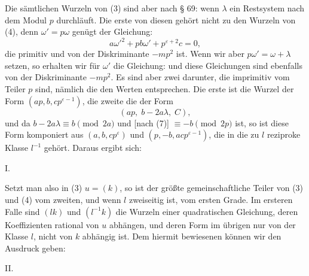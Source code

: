Die sämtlichen Wurzeln von (3) sind aber nach § 69:
wenn $\lambda$ ein Restsystem nach dem Modul $p$ durchläuft. Die erste
von diesen gehört nicht zu den Wurzeln von (4), denn $\omega' = p\omega$
genügt der Gleichung:
\[
a\omega'^2 + p b \omega' + p^{\varepsilon+2} c = 0,
\]
die primitiv und von der Diskriminante $-mp^2$ ist. Wenn wir aber
$p\omega' = \omega + \lambda$ setzen, so erhalten wir für $\omega'$ die Gleichung:
und diese Gleichungen sind ebenfalls von der Diskriminante
$-mp^2$. Es sind aber zwei darunter, die imprimitiv vom Teiler $p$
sind, nämlich die den Werten
entsprechen. Die erste ist die Wurzel der Form $(a p, b, c p^{\varepsilon-1})$, die
zweite die der Form
\[
(a p, \; b - 2a\lambda, \; C),
\]
und da $b - 2a\lambda \equiv b \pmod{2a}$ und [nach (7)] $\equiv -b \pmod{2p}$
ist, so ist diese Form komponiert aus $(a, b, c p^{\varepsilon})$ und $(p, -b, a c p^{\varepsilon-1})$,
die in die zu $l$ reziproke Klasse $l^{-1}$ gehört. Daraus ergibt sich:

I. 

Setzt man also in (3) $u = (k)$, so ist der größte gemeinschaftliche
 Teiler von (3) und (4) vom zweiten, und wenn $l$
zweiseitig ist, vom ersten Grade. Im ersteren Falle sind $(lk)$ und
$(l^{-1}k)$ die Wurzeln einer quadratischen Gleichung, deren Koeffizienten
 rational von $u$ abhängen, und deren Form im übrigen
nur von der Klasse $l$, nicht von $k$ abhängig ist. Dem hiermit
bewiesenen können wir den Ausdruck geben:

II. 
